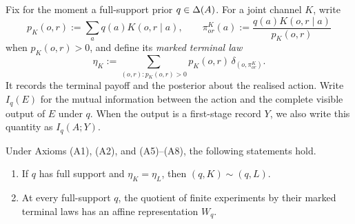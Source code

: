 Fix for the moment a full-support prior $q\in\Delta(A)$.  For a joint channel $K$,
write
\[
p_K(o,r):=\sum_a q(a)K(o,r\mid a),
\qquad
\pi^K_{or}(a):=\frac{q(a)K(o,r\mid a)}{p_K(o,r)}
\]
when $p_K(o,r)>0$, and define its \emph{marked terminal law}
\begin{equation}
\eta_K:=\sum_{(o,r):p_K(o,r)>0}
p_K(o,r)\,\delta_{(o,\pi^K_{or})}.
\label{lf:eq:marked-law}
\end{equation}
It records the terminal payoff and the posterior about the realised action.
Write $I_q(E)$ for the mutual information between the action and the complete
visible output of $E$ under $q$.  When the output is a first-stage record $Y$,
we also write this quantity as $I_q(A;Y)$.

\begin{lemma}\label{lf:lem:terminal-affine}
Under Axioms \textup{(A1)}, \textup{(A2)}, and
\textup{(A5)--(A8)}, the following statements hold.
\begin{enumerate}[label=\textup{(\alph*)},leftmargin=*]
\item If $q$ has full support and $\eta_K=\eta_L$, then
  $(q,K)\sim(q,L)$.
\item At every full-support $q$, the quotient of finite experiments by their
  marked terminal laws has an affine representation $W_q$.
\end{enumerate}
\end{lemma}

